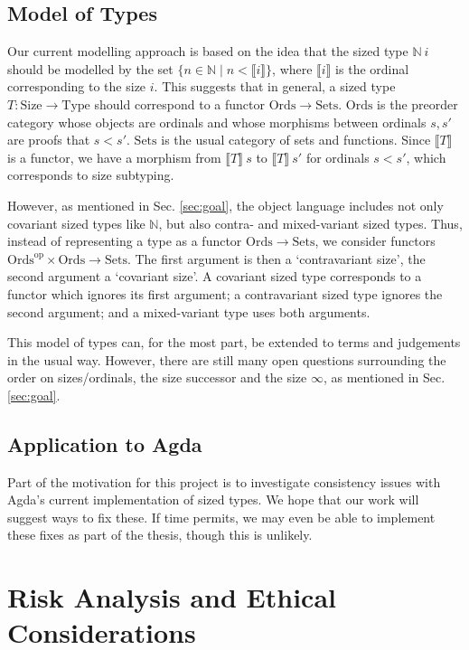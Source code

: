 \documentclass{scrartcl}
\newcommand*{\Sets}{\ensuremath{\mathrm{Sets}}}
\newcommand*{\Ords}{\ensuremath{\mathrm{Ords}}}
\newcommand*{\op}[1]{\ensuremath{#1^\mathrm{op}}}
\begin{document}
\subsection{Model of Types}

Our current modelling approach is based on the idea that the sized type $ℕ~i$
should be modelled by the set $\{n ∈ ℕ \;|\; n < ⟦i⟧ \}$, where $⟦i⟧$ is the
ordinal corresponding to the size $i$. This suggests that in general, a sized
type $T : \mathrm{Size} → \mathrm{Type}$ should correspond to a functor $\Ords →
\Sets$. $\Ords$ is the preorder category whose objects are ordinals and whose
morphisms between ordinals $s, s′$ are proofs that $s < s′$. $\Sets$ is the
usual category of sets and functions. Since $⟦T⟧$ is a functor, we have
a morphism from $⟦T⟧~s$ to $⟦T⟧~s′$ for ordinals $s < s'$, which corresponds to
size subtyping.

However, as mentioned in Sec. \ref{sec:goal}, the object language includes not
only covariant sized types like $ℕ$, but also contra- and mixed-variant sized
types. Thus, instead of representing a type as a functor $\Ords → \Sets$, we
consider functors $\op{\Ords} × \Ords → \Sets$. The first argument is then a
\enquote*{contravariant size}, the second argument a \enquote*{covariant size}.
A covariant sized type corresponds to a functor which ignores its first argument;
a contravariant sized type ignores the second argument; and a mixed-variant type uses
both arguments.

This model of types can, for the most part, be extended to terms and judgements
in the usual way. However, there are still many open questions surrounding the
order on sizes/ordinals, the size successor and the size $∞$, as mentioned in
Sec. \ref{sec:goal}.

\subsection{Application to Agda}

Part of the motivation for this project is to investigate consistency issues
with Agda's current implementation of sized types. We hope that our work will
suggest ways to fix these. If time permits, we may even be able to implement
these fixes as part of the thesis, though this is unlikely.


\section{Risk Analysis and Ethical Considerations}
\end{document}
